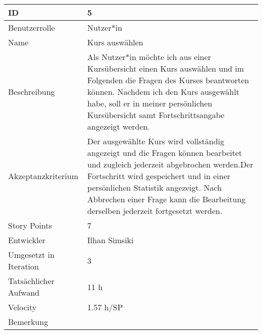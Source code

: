 \begin{tabularx}{\textwidth}{|p{}|X|}
	\hline
	ID & 5\\
	\hline
	Benutzerrolle & Nutzer*in\\
	\hline
	Name & Kurs auswählen\\
	\hline
	Beschreibung & Als Nutzer*in möchte ich aus einer Kursübersicht einen Kurs auswählen und im Folgenden die Fragen des Kurses beantworten können. Nachdem ich den Kurs ausgewählt habe, soll er in meiner persönlichen Kursübersicht samt Fortschrittsangabe angezeigt werden.\\
	\hline
	Akzeptanzkriterium & Der ausgewählte Kurs wird vollständig angezeigt und die Fragen können bearbeitet und zugleich jederzeit abgebrochen werden.Der Fortschritt wird gespeichert und in einer persönlichen Statistik angezeigt. Nach Abbrechen einer Frage kann die Bearbeitung derselben jederzeit fortgesetzt werden.\\
	\hline
	Story Points & 7\\
	\hline
	Entwickler & Ilhan Simsiki\\
	\hline
	Umgesetzt in Iteration & 3\\
	\hline
	Tatsächlicher Aufwand & 11 h\\
	\hline
	Velocity & 1.57 h/SP\\
	\hline
	Bemerkung & \\
	\hline
\end{tabularx}
\vspace{20pt}
